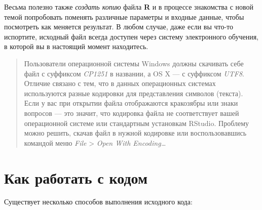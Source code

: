 \documentclass[]{book}
\begin{document}
Весьма полезно также \emph{создать копию} файла \textbf{R} и в процессе
знакомства с новой темой попробовать поменять различные параметры и
входные данные, чтобы посмотреть как меняется результат. В любом случае,
даже если вы что-то испортите, исходный файл всегда доступен через
систему электронного обучения, в которой вы в настоящий момент
находитесь.

\begin{quote}
Пользователи операционной системы Windows должны скачивать себе файл с
суффиксом \emph{CP1251} в названии, а OS X --- с суффиксом \emph{UTF8}.
Отличие связано с тем, что в данных операционных системах используются
разные кодировки для представления символов (текста). Если у вас при
открытии файла отображаются кракозябры или знаки вопросов --- это
значит, что кодировка файла не соответствует вашей операционной системе
или стандартным установкам RStudio. Проблему можно решить, скачав файл в
нужной кодировке или воспользовавшись командой меню \emph{File}
\textgreater{} \emph{Open With Encoding\ldots{}}
\end{quote}

\section*{Как работать с кодом}\label{---}

Существует несколько способов выполнения исходного кода:
\end{document}
